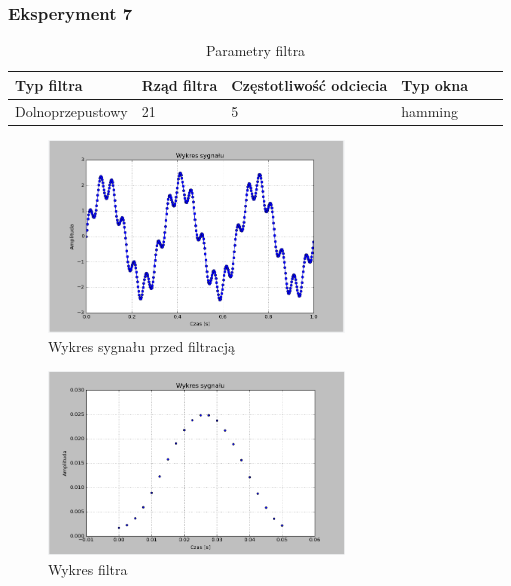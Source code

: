 \documentclass{article}
\begin{document}
{        \subsubsection{Eksperyment 7} {
            \begin{table}[h!]
            \centering
            \begin{tabular}{|l|l|l|l|l|l|}
            \hline
            Typ filtra & Rząd filtra & Częstotliwość odciecia & Typ okna  \\\hline
            Dolnoprzepustowy & 21 & 5 & hamming     \\\hline
            \end{tabular}
            \caption{Parametry filtra}
            \end{table}
            \begin{figure}[h!]
                \centering
                \includegraphics[width=0.7\textwidth]{img/sig.png}
                \caption{Wykres sygnału przed filtracją}
            \end{figure}
            \begin{figure}[h!]
                \centering
                \includegraphics[width=0.7\textwidth]{img/fil13.png}
                \caption{Wykres filtra}
            \end{figure}

}}
\end{document}
